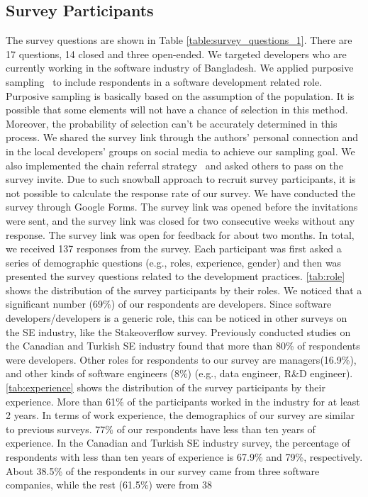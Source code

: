 \subsection{Survey Participants}
\label{survey_participants}

The survey questions are shown in Table \ref{table:survey_questions_1}. There are 17 questions, 14 closed and three open-ended.
We targeted developers who are currently working in the
software industry of Bangladesh. 
%
We applied purposive sampling~\citep{Vogt2005} to
include respondents in a software development related role. Purposive sampling
is basically based on the assumption of the population. It is possible that some
elements will not have a chance of selection in this method. Moreover, the
probability of selection can't be accurately determined in this process. We
shared the survey link through the authors' personal connection and in the local
developers' groups on social media to achieve our sampling goal. We also
implemented the chain referral strategy~\citep{creswell2013} and asked others to
pass on the survey invite. Due to such snowball approach to recruit survey participants, it is not possible to calculate the
response rate of our survey. We have conducted the survey through Google Forms. The survey link was opened
before the invitations were sent, and the survey link was closed for two
consecutive weeks without any response. The survey link was open for feedback
for about two months. In total, we
received 137 responses from the survey. Each participant was first asked a series of demographic questions (e.g., roles, experience, gender) and 
then was presented the survey questions related to the development practices. 
\tbl\ref{tab:role} shows the distribution of the survey participants by their roles. We noticed that a significant number (69\%) of our respondents are developers. Since software developers/developers is a generic role, this can be noticed in other surveys on the SE industry, like the Stakeoverflow survey\citep{StackoverflowSurvey2020,StackoverflowSurvey2019}. Previously conducted studies on the Canadian\citep{Garousi2013} and Turkish\citep{Garousi2015} SE industry found that more than 80\% of respondents were developers. Other roles for respondents to our survey are managers(16.9\%), and other kinds of software engineers (8\%) (e.g., data engineer, R\&D engineer).
\tbl\ref{tab:experience} shows the distribution of the survey participants by their experience. More than 61\% of the participants worked in the
industry for at least 2 years. In terms of work experience, the demographics of our survey are similar to previous surveys. 77\% of our respondents have less than ten years of experience. In the Canadian and Turkish SE industry survey, the percentage of respondents with less than ten years of experience is 67.9\% and  79\%, respectively. About 38.5\% of the respondents in our survey came from three software companies, while the rest (61.5\%) were from 38 
